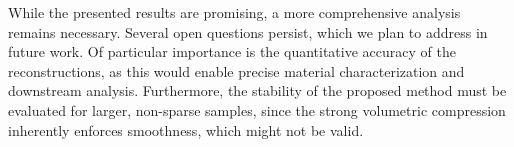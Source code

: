 \documentclass{article}
\begin{document}
While the presented results are promising, a more comprehensive analysis remains necessary.
Several open questions persist, which we plan to address in future work.
Of particular importance is the quantitative accuracy of the reconstructions, as this would enable precise material characterization and downstream analysis.
Furthermore, the stability of the proposed method must be evaluated for larger, non-sparse samples, since the strong volumetric compression inherently enforces smoothness, which might not be valid.

\vfill\pagebreak


\end{document}
